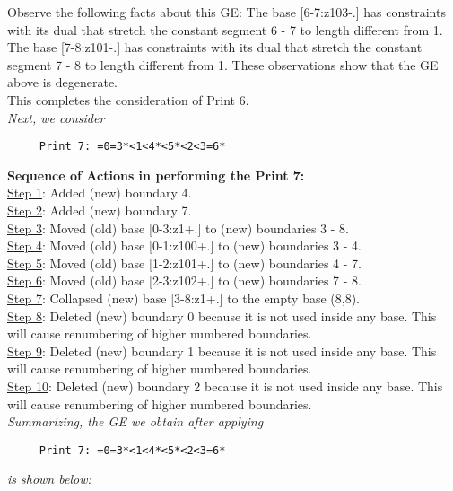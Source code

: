 \documentclass[final]{article}
\begin{document}
Observe the following facts about this GE:
The base [6-7:z103-.]  has constraints with its dual that stretch the constant segment 6 - 7 to length different from 1.  The base [7-8:z101-.]  has constraints with its dual that stretch the constant segment 7 - 8 to length different from 1.  These observations show that the GE above is degenerate.\\[0.1in]
This completes the consideration of Print 6.\\[0.1in]
{\em Next, we consider}
\begin{verbatim}
     Print 7: =0=3*<1<4*<5*<2<3=6*
\end{verbatim}
{\bf Sequence of Actions in performing the Print 7:}\\
{\underline{Step 1}:} Added (new) boundary 4.\\
{\underline{Step 2}:} Added (new) boundary 7.\\
{\underline{Step 3}:} Moved (old) base [0-3:z1+.]  to (new) boundaries 3 - 8.\\
{\underline{Step 4}:} Moved (old) base [0-1:z100+.]  to (new) boundaries 3 - 4.\\
{\underline{Step 5}:} Moved (old) base [1-2:z101+.]  to (new) boundaries 4 - 7.\\
{\underline{Step 6}:} Moved (old) base [2-3:z102+.]  to (new) boundaries 7 - 8.\\
{\underline{Step 7}:} Collapsed (new) base [3-8:z1+.]  to the empty base (8,8).
\\
{\underline{Step 8}:} Deleted (new) boundary 0 because it is not used inside any base.  This will cause renumbering of higher numbered boundaries.
\\
{\underline{Step 9}:} Deleted (new) boundary 1 because it is not used inside any base.  This will cause renumbering of higher numbered boundaries.
\\
{\underline{Step 10}:} Deleted (new) boundary 2 because it is not used inside any base.  This will cause renumbering of higher numbered boundaries.
\\[0.1in]
{\em Summarizing, the GE we obtain after applying}
\begin{verbatim}
     Print 7: =0=3*<1<4*<5*<2<3=6*
\end{verbatim}
{\em is shown below:}
\end{document}
